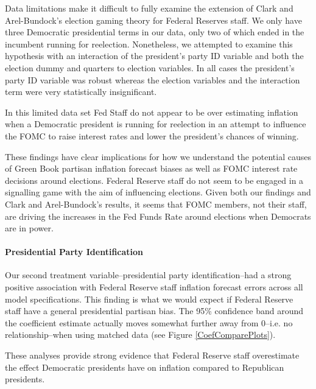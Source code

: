 \documentclass[a4paper]{article}\usepackage{graphicx, color}
\begin{document}
Data limitations make it difficult to fully examine the extension of Clark and Arel-Bundock's \citeyearpar{Clark2011} election gaming theory for Federal Reserves staff. We only have three Democratic presidential terms in our data, only two of which ended in the incumbent running for reelection. Nonetheless, we attempted to examine this hypothesis with an interaction of the president's party ID variable and both the election dummy and quarters to election variables. In all cases the president's party ID variable was robust whereas the election variables and the interaction term were very statistically insignificant.

In this limited data set Fed Staff do not appear to be over estimating inflation when a Democratic president is running for reelection in an attempt to influence the FOMC to raise interest rates and lower the president's chances of winning. 

These findings have clear implications for how we understand the potential causes of Green Book partisan inflation forecast biases as well as FOMC interest rate decisions around elections. Federal Reserve staff do not seem to be engaged in a signalling game with the aim of influencing elections. Given both our findings and Clark and Arel-Bundock's results, it seems that FOMC members, not their staff, are driving the increases in the Fed Funds Rate around elections when Democrats are in power. 

\paragraph{Presidential Party Identification}

Our second treatment variable--presidential party identification--had a strong positive association with Federal Reserve staff inflation forecast errors across all model specifications. This finding is what we would expect if Federal Reserve staff have a general presidential partisan bias. The 95\% confidence band around the coefficient estimate actually moves somewhat further away from 0--i.e. no relationship--when using matched data (see Figure \ref{CoefComparePlots}).  

These analyses provide strong evidence that Federal Reserve staff overestimate the effect Democratic presidents have on inflation compared to Republican presidents.
\end{document}
